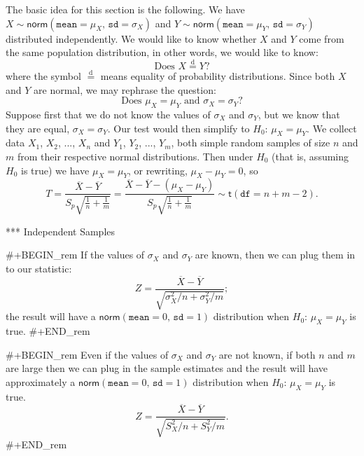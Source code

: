 The basic idea for this section is the following. We have
\(X\sim\mathsf{norm}(\mathtt{mean} = \mu_{X},\,\mathtt{sd} =
\sigma_{X})\) and \(Y\sim\mathsf{norm}(\mathtt{mean} =
\mu_{Y},\,\mathtt{sd} = \sigma_{Y})\) distributed independently. We
would like to know whether \(X\) and \(Y\) come from the same
population distribution, in other words, we would like to know:
\begin{equation}
\mbox{Does }X\overset{\mathrm{d}}{=}Y?
\end{equation}
where the symbol \(\overset{\mathrm{d}}{=}\) means equality of
probability distributions.  Since both \(X\) and \(Y\) are normal, we
may rephrase the question:
\begin{equation}
\mbox{Does }\mu_{X} = \mu_{Y}\mbox{ and }\sigma_{X} = \sigma_{Y}?
\end{equation}
Suppose first that we do not know the values of \(\sigma_{X}\) and
\(\sigma_{Y}\), but we know that they are equal,
\(\sigma_{X}=\sigma_{Y}\). Our test would then simplify to
\(H_{0}:\,\mu_{X} = \mu_{Y}\). We collect data \(X_{1}\), \(X_{2}\),
..., \(X_{n}\) and \(Y_{1}\), \(Y_{2}\), ..., \(Y_{m}\), both simple
random samples of size \(n\) and \(m\) from their respective normal
distributions. Then under \(H_{0}\) (that is, assuming \(H_{0}\) is
true) we have \(\mu_{X} = \mu_{Y}\), or rewriting, \(\mu_{X} - \mu_{Y}
= 0\), so
\begin{equation}
T = \frac{\overline{X} - \overline{Y}}{S_{p}\sqrt{\frac{1}{n} + \frac{1}{m}}} = \frac{\overline{X} - \overline{Y} - (\mu_{X} - \mu_{Y})}{S_{p}\sqrt{\frac{1}{n} + \frac{1}{m}}}\sim\mathsf{t}(\mathtt{df} = n + m - 2).
\end{equation}

*** Independent Samples

#+BEGIN_rem
If the values of \(\sigma_{X}\) and \(\sigma_{Y}\) are known, then we
can plug them in to our statistic:
\begin{equation} 
Z = \frac{\overline{X} - \overline{Y}}{\sqrt{\sigma_{X}^{2}/n + \sigma_{Y}^{2}/m}};
\end{equation}
the result will have a \(\mathsf{norm}(\mathtt{mean} = 0,\,\mathtt{sd}
= 1)\) distribution when \(H_{0}:\,\mu_{X} = \mu_{Y}\) is true.
#+END_rem

#+BEGIN_rem
Even if the values of \(\sigma_{X}\) and \(\sigma_{Y}\) are not known,
if both \(n\) and \(m\) are large then we can plug in the sample
estimates and the result will have approximately a
\(\mathsf{norm}(\mathtt{mean} = 0,\,\mathtt{sd} = 1)\) distribution when
\(H_{0}:\,\mu_{X} = \mu_{Y}\) is true.
\begin{equation} 
Z = \frac{\overline{X} - \overline{Y}}{\sqrt{S_{X}^{2}/n + S_{Y}^{2}/m}}.
\end{equation}
#+END_rem


